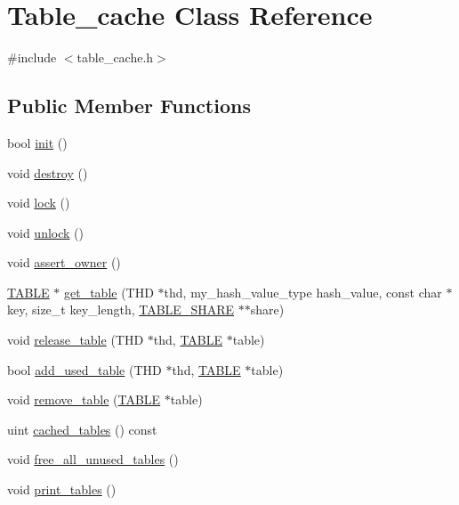 \hypertarget{classTable__cache}{}\section{Table\+\_\+cache Class Reference}
\label{classTable__cache}


{\ttfamily \#include $<$table\+\_\+cache.\+h$>$}

\subsection*{Public Member Functions}
\begin{DoxyCompactItemize}
\item 
bool \mbox{\hyperlink{classTable__cache_a24ff101df5431dc1fe69fd83f34db9f8}{init}} ()
\item 
void \mbox{\hyperlink{classTable__cache_a455cced61e30205fde43e97a40f7889b}{destroy}} ()
\item 
void \mbox{\hyperlink{classTable__cache_a04900b8af1fb846ca4110593291c0447}{lock}} ()
\item 
void \mbox{\hyperlink{classTable__cache_a101b725dc04235f5be210378363a816c}{unlock}} ()
\item 
void \mbox{\hyperlink{classTable__cache_a60266ef71fbd59bdcc415880898fb1b4}{assert\+\_\+owner}} ()
\item 
\mbox{\hyperlink{structTABLE}{T\+A\+B\+LE}} $\ast$ \mbox{\hyperlink{classTable__cache_a9edaddf4d6af456120fcb89a30bce264}{get\+\_\+table}} (T\+HD $\ast$thd, my\+\_\+hash\+\_\+value\+\_\+type hash\+\_\+value, const char $\ast$key, size\+\_\+t key\+\_\+length, \mbox{\hyperlink{structTABLE__SHARE}{T\+A\+B\+L\+E\+\_\+\+S\+H\+A\+RE}} $\ast$$\ast$share)
\item 
void \mbox{\hyperlink{classTable__cache_a44a41982d66f7084599befd4ad92f1b9}{release\+\_\+table}} (T\+HD $\ast$thd, \mbox{\hyperlink{structTABLE}{T\+A\+B\+LE}} $\ast$table)
\item 
bool \mbox{\hyperlink{classTable__cache_a0a74ea3cbfcab0314e4ef160979a2962}{add\+\_\+used\+\_\+table}} (T\+HD $\ast$thd, \mbox{\hyperlink{structTABLE}{T\+A\+B\+LE}} $\ast$table)
\item 
void \mbox{\hyperlink{classTable__cache_ae6ac88435d0e282a272cb76836a68e7f}{remove\+\_\+table}} (\mbox{\hyperlink{structTABLE}{T\+A\+B\+LE}} $\ast$table)
\item 
uint \mbox{\hyperlink{classTable__cache_ac2d4ee1ea253452eb204577ce0111d0a}{cached\+\_\+tables}} () const
\item 
void \mbox{\hyperlink{classTable__cache_a761f02e59e45c74fdaf47815ed01ce09}{free\+\_\+all\+\_\+unused\+\_\+tables}} ()
\item 
void \mbox{\hyperlink{classTable__cache_ad83b8dd133dfe3b3091124d1a75ff693}{print\+\_\+tables}} ()
\end{DoxyCompactItemize}
